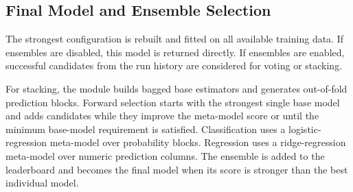 \documentclass[12pt,a4paper]{report}
\begin{document}
\subsection{Final Model and Ensemble Selection}
The strongest configuration is rebuilt and fitted on all available training
data. If ensembles are disabled, this model is returned directly. If ensembles
are enabled, successful candidates from the run history are considered for
voting or stacking.

For stacking, the module builds bagged base estimators and generates
out-of-fold prediction blocks. Forward selection starts with the strongest
single base model and adds candidates while they improve the meta-model score
or until the minimum base-model requirement is satisfied. Classification uses a
logistic-regression meta-model over probability blocks. Regression uses a
ridge-regression meta-model over numeric prediction columns. The ensemble is
added to the leaderboard and becomes the final model when its score is stronger
than the best individual model.
\end{document}

